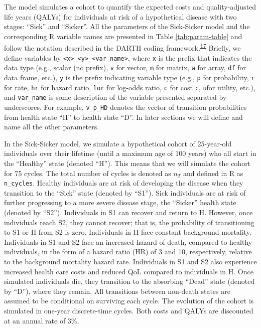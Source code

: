 \documentclass[
]{article}
\begin{document}
The model simulates a cohort to quantify the expected costs and quality-adjusted life years (QALYs) for individuals at risk of a hypothetical disease with two stages: ``Sick'' and ``Sicker''.
All the parameters of the Sick-Sicker model and the corresponding R variable names are presented in Table \ref{tab:param-table} and follow the notation described in the DARTH coding framework.\textsuperscript{\protect\hyperlink{ref-Alarid-Escudero2019e}{17}} Briefly, we define variables by \texttt{\textless{}x\textgreater{}\_\textless{}y\textgreater{}\_\textless{}var\_name\textgreater{}}, where \texttt{x} is the prefix that indicates the data type (e.g., scalar (no prefix), \texttt{v} for vector, \texttt{m} for matrix, \texttt{a} for array, \texttt{df} for data frame, etc.), \texttt{y} is the prefix indicating variable type (e.g., \texttt{p} for probability, \texttt{r} for rate, \texttt{hr} for hazard ratio, \texttt{lor} for log-odds ratio, \texttt{c} for cost \texttt{c}, \texttt{u}for utility, etc.), and \texttt{var\_name} is some description of the variable presented separated by underscores. For example, \texttt{v\_p\_HD} denotes the vector of transition probabilities from health state ``H'' to health state ``D''. In later sections we will define and name all the other parameters.

In the Sick-Sicker model, we simulate a hypothetical cohort of 25-year-old individuals over their lifetime (until a maximum age of 100 years) who all start in the ``Healthy'' state (denoted ``H''). This means that we will simulate the cohort for 75 cycles. The total number of cycles is denoted as \(n_T\) and defined in R as \texttt{n\_cycles}. Healthy individuals are at risk of developing the disease when they transition to the ``Sick'' state (denoted by ``S1''). Sick individuals are at risk of further progressing to a more severe disease stage, the ``Sicker'' health state (denoted by ``S2''). Individuals in S1 can recover and return to H. However, once individuals reach S2, they cannot recover; that is, the probability of transitioning to S1 or H from S2 is zero. Individuals in H face constant background mortality. Individuals in S1 and S2 face an increased hazard of death, compared to healthy individuals, in the form of a hazard ratio (HR) of 3 and 10, respectively, relative to the background mortality hazard rate. Individuals in S1 and S2 also experience increased health care costs and reduced QoL compared to individuals in H. Once simulated individuals die, they transition to the absorbing ``Dead'' state (denoted by ``D''), where they remain. All transitions between non-death states are assumed to be conditional on surviving each cycle. The evolution of the cohort is simulated in one-year discrete-time cycles. Both costs and QALYs are discounted at an annual rate of 3\%.
\end{document}
